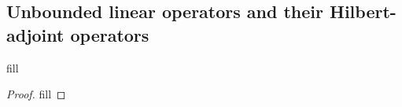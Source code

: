 \subsection{Unbounded linear operators and their Hilbert-adjoint operators}

\begin{exercise}{1}
fill
\end{exercise}
\begin{proof}
fill
\end{proof}